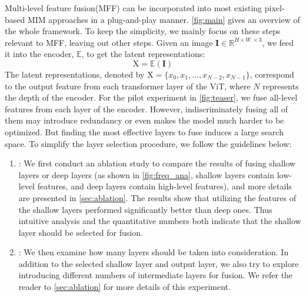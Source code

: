 Multi-level feature fusion(MFF) can be incorporated into most existing pixel-based MIM approaches in a plug-and-play manner. \autoref{fig:main} gives an overview of the whole framework.
To keep the simplicity, we mainly focus on these steps relevant to MFF, leaving out other steps.  Given an image $\mathbf{I}\in \mathbb{R}^{H\times W\ \times3}$, we feed it into the encoder, $\mathbb{E}$, to get the latent representations:
\begin{equation}
    \label{eq:extract}
    \mathrm{X} = \mathbb{E}(\mathbf{I})
\end{equation}
The latent representations, denoted by $\mathrm{X} = \{x_0, x_1, ..., x_{N-2}, x_{N-1}\}$, correspond to the output feature from each transformer layer of the ViT, where $N$ represents the depth of the encoder. For the pilot experiment in \autoref{fig:teaser}, we fuse all-level features from each layer of the encoder. However, indiscriminately fusing all of them may introduce redundancy or even makes the model much harder to be optimized. But finding the most effective layers to fuse induces a large search space. To simplify the layer selection procedure, we follow the guidelines below:

\begin{enumerate}[label={\bf {{(\arabic*)}}},leftmargin=*,topsep=0.5ex,itemsep=-0.5ex,partopsep=0.75ex,parsep=0.75ex,partopsep=0pt,wide, labelwidth=0pt,labelindent=0pt]
    \item: We first conduct an ablation study to compare the results of fusing shallow layers or deep layers (as shown in  \autoref{fig:freq_ana}, shallow layers contain low-level features, and deep layers contain high-level features), and more details are presented in \autoref{sec:ablation}. The results show that utilizing the features of the shallow layers performed significantly better than deep ones. Thus intuitive analysis and the quantitative numbers both indicate that the shallow layer should be selected for fusion.
    \item: We then examine how many layers should be taken into consideration. In addition to the selected shallow layer and output layer, we also try to explore introducing different numbers of intermediate layers for fusion. We refer the reader to \autoref{sec:ablation} for more details of this experiment.
\end{enumerate}

